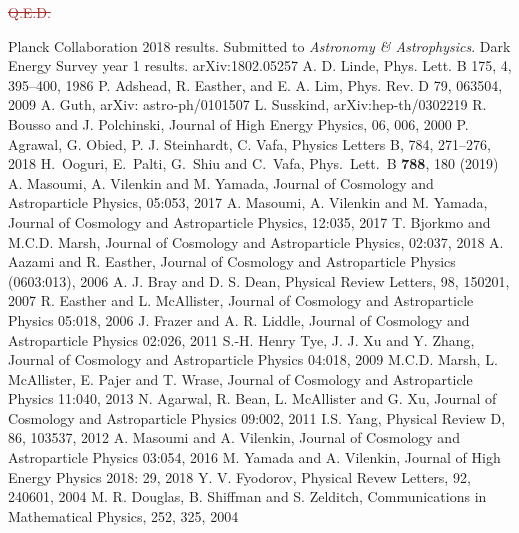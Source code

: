 \documentclass[12pt]{article}
\newcommand{\sh}[1]{\textcolor{brown}{#1}}
\begin{document}
\sh{\sout{Q.E.D.}}

\begin{thebibliography}{99}
 Planck Collaboration 2018 results. Submitted to \emph{Astronomy \& Astrophysics}.
 Dark Energy Survey year 1 results. arXiv:1802.05257
 A. D. Linde, Phys. Lett. B 175, 4, 395--400, 1986
 P. Adshead, R. Easther, and E. A. Lim, Phys. Rev. D 79, 063504, 2009
 A. Guth, arXiv: astro-ph/0101507
 L. Susskind, arXiv:hep-th/0302219
 R. Bousso and J. Polchinski, Journal of High Energy Physics, 06, 006, 2000
 P. Agrawal, G. Obied, P. J. Steinhardt, C. Vafa, Physics Letters B, 784, 271--276, 2018
  H.~Ooguri, E.~Palti, G.~Shiu and C.~Vafa,   Phys.\ Lett.\ B {\bf 788}, 180 (2019)
 A. Masoumi, A. Vilenkin and M. Yamada, Journal of Cosmology and Astroparticle Physics, 05:053, 2017
 A. Masoumi, A. Vilenkin and M. Yamada, Journal of Cosmology and Astroparticle Physics, 12:035, 2017
 T. Bjorkmo and M.C.D. Marsh, Journal of Cosmology and Astroparticle Physics, 02:037, 2018
 A. Aazami and R. Easther, Journal of Cosmology and Astroparticle Physics (0603:013), 2006
 A. J. Bray and D. S. Dean, Physical Review Letters, 98, 150201, 2007
 R. Easther and L. McAllister, Journal of Cosmology and Astroparticle Physics 05:018, 2006
 J. Frazer and A. R. Liddle, Journal of Cosmology and Astroparticle Physics 02:026, 2011
 S.-H. Henry Tye, J. J. Xu and Y. Zhang, Journal of Cosmology and Astroparticle Physics 04:018, 2009
 M.C.D. Marsh, L. McAllister, E. Pajer and T. Wrase, Journal of Cosmology and Astroparticle Physics 11:040, 2013
 N. Agarwal, R. Bean, L. McAllister and G. Xu, Journal of Cosmology and Astroparticle Physics 09:002, 2011
 I.S. Yang, Physical Review D, 86, 103537, 2012
 A. Masoumi and A. Vilenkin, Journal of Cosmology and Astroparticle Physics 03:054, 2016
 M. Yamada and A. Vilenkin, Journal of High Energy Physics 2018: 29, 2018
 Y. V. Fyodorov, Physical Revew Letters, 92, 240601, 2004
 M. R. Douglas, B. Shiffman and S. Zelditch, Communications in Mathematical Physics, 252, 325, 2004

\end{thebibliography}
\end{document}
